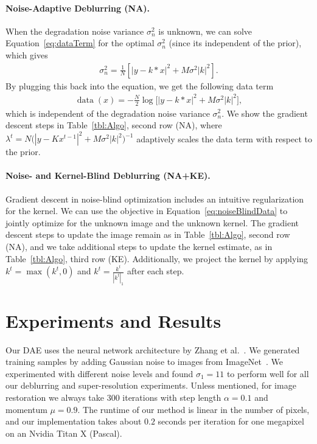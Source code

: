 \documentclass{article}
\DeclareMathOperator*{\data}{data}
\begin{document}
\paragraph{Noise-Adaptive Deblurring (NA).}
When the degradation noise variance $\sigma_n^2$ is unknown, we can solve Equation~\eqref{eq:dataTerm} for the optimal $\sigma_n^2$ (since its independent of the prior), which gives
\begin{align}
\sigma_n^2 = \frac{1}{N} \left[ |y - k*x|^2 + M \sigma^2 |k|^2 \right].
\end{align}
By plugging this back into the equation, we get the following data term
\begin{align}
\data(x) = -\frac{N}{2} \log \big[ |y-k*x|^2 + M \sigma^2|k|^2 \big],
\label{eq:noiseBlindData}
\end{align}
which is independent of the degradation noise variance $\sigma_n^2$.
We show the gradient descent steps in Table~\ref{tbl:Algo}, second row (NA), where $\lambda^t = N \big(|y-Kx^{t-1}|^2 + M \sigma^2|k|^2 \big) ^{-1}$ adaptively scales the data term with respect to the prior.

\paragraph{Noise- and Kernel-Blind Deblurring (NA+KE).}
Gradient descent in noise-blind optimization includes an intuitive regularization for the kernel.
We can use the objective in Equation~\eqref{eq:noiseBlindData} to jointly optimize for the unknown image and the unknown kernel.
The gradient descent steps to update the image remain as in Table~\ref{tbl:Algo}, second row (NA), and we take additional steps to update the kernel estimate, as in Table~\ref{tbl:Algo}, third row (KE).
Additionally, we project the kernel by applying $k^{t}=\max(k^{t}, 0)$ and $k^{t} = \frac{k^{t}}{|k^{t}|_1}$ after each step.


\section{Experiments and Results}

Our DAE uses the neural network architecture by Zhang et al.~\cite{zhang2016beyond}.
We generated training samples by adding Gaussian noise to images from ImageNet~\cite{deng2009imagenet}.
We experimented with different noise levels and found $\sigma_1 = 11$ to perform well for all our deblurring and super-resolution experiments.
Unless mentioned, for image restoration we always take 300 iterations with step length $\alpha = 0.1$ and momentum $\mu = 0.9$.
The runtime of our method is linear in the number of pixels, and our implementation takes about $0.2$ seconds per iteration for one megapixel on an Nvidia Titan X (Pascal).
\end{document}
